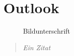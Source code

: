 \section{Outlook}\label{outlook}	
	
		\begin{figure}[htbp]
			\centering
			\caption[xxx]{Bildunterschrift}
			\label{xxx}
		\end{figure}
		
		
		\begin{quote}
			\textit{Ein Zitat}
		\end{quote}


				\autocite[20]{}


\newpage






